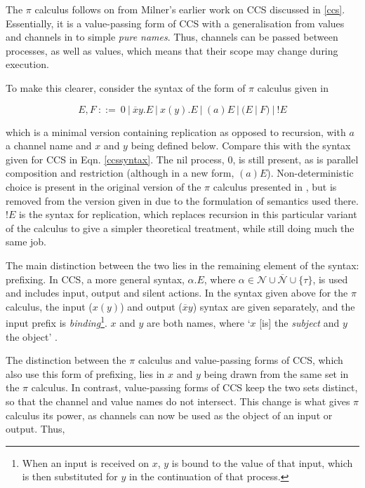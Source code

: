 The $\pi$ calculus follows on from Milner's earlier work on CCS
discussed in \ref{ccs}. Essentially, it is a value-passing form of CCS
with a generalisation from values and channels in to simple \emph{pure
  names}.  Thus, channels can be passed between processes, as well as
values, which means that their scope may change during execution.

To make this clearer, consider the syntax of the form of $\pi$ calculus
given in \cite{funcproc}

\begin{equation}
\label{pisyntax}
  E, F\ ::=\ 
  0\ |\ 
  \overline{x}y.E\ |\ 
  x(y).E\ |\ 
  (a)E\ |\ 
  (E\ |\ F)\ |\ 
  !E
\end{equation}
  
\noindent which is a minimal version containing replication as opposed
to recursion, with $a$ a channel name and $x$ and $y$ being defined
below.  Compare this with the syntax given for CCS in Eqn.
\ref{ccssyntax}.  The nil process, $0$, is still present, as is parallel
composition and restriction (although in a new form, $(a)E$).
Non-deterministic choice is present in the original version of the $\pi$
calculus presented in \cite{picalctutorial}, but is removed from the
version given in \cite{funcproc} due to the formulation of semantics
used there.  $!E$ is the syntax for replication, which replaces
recursion in this particular variant of the calculus to give a simpler
theoretical treatment, while still doing much the same job.

The main distinction between the two lies in the remaining element of
the syntax: prefixing.  In CCS, a more general syntax,
$\alpha.E$, where $\alpha \in \mathcal{N} \cup \overline{\mathcal{N}}
\cup \{\tau\}$, is used and includes input, output and silent actions.  In the
syntax given above for the $\pi$ calculus, the input ($x(y)$) and output
($\overline{x}y$) syntax are given separately, and the input prefix is
\emph{binding}\footnote{When an input is received on $x$, $y$ is bound
to the value of that input, which is then substituted for $y$ in the
continuation of that process.}. $x$ and $y$ are both names, where `$x$
[is] the \emph{subject} and $y$ the object' \cite{funcproc}.  

The distinction between the $\pi$ calculus and value-passing forms of
CCS, which also use this form of prefixing, lies in $x$ and $y$ being
drawn from the same set in the $\pi$ calculus.  In contrast,
value-passing forms of CCS keep the two sets distinct, so that the
channel and value names do not intersect.  This change is what
gives $\pi$ calculus its power, as channels can now be used as the
object of an input or output.  Thus,

